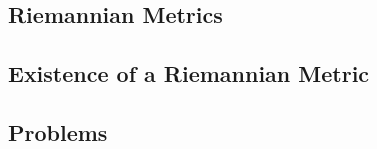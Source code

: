 \subsection{Riemannian Metrics}

\subsection{Existence of a Riemannian Metric}

\subsection{Problems}